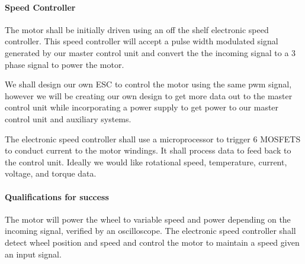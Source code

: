 \documentclass[12pt,article]{IEEEtran}
\begin{document}
    
        \paragraph{\bfseries Speed Controller}
            The motor shall be initially driven using an off the shelf electronic speed controller. This speed
            controller will accept a pulse width modulated signal generated by our master control unit and convert
            the the incoming signal to a 3 phase signal to power the motor.

            We shall design our own ESC to control the motor using the same pwm signal, however we will be 
            creating our own design to get more data out to the master control unit while incorporating a 
            power supply to get power to our master control unit and auxiliary systems.

            The electronic speed controller shall use a microprocessor to trigger 6 MOSFETS to conduct current 
            to the motor windings. It shall process data to feed back to the control unit. Ideally we would like 
            rotational speed, temperature, current, voltage, and torque data.

        \paragraph{\bfseries Qualifications for success}
            The motor will power the wheel to variable speed and power depending on the incoming signal, verified
            by an oscilloscope. The electronic speed controller shall detect wheel position and speed and control
            the motor to maintain a speed given an input signal.
            
\end{document}

